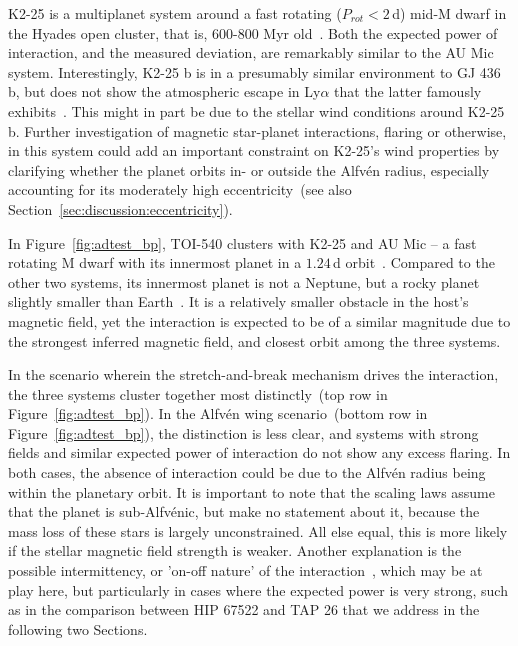 \documentclass[twocolumn]{aastex631}
\begin{document}
K2-25 is a multiplanet system around a fast rotating ($P_{rot}<2\,$d) mid-M dwarf in the Hyades open cluster, that is, 600-800 Myr old~\citep{stefansson2020habitable}. Both the expected power of interaction, and the measured deviation, are remarkably similar to the AU Mic system. Interestingly, K2-25 b is in a presumably similar environment to GJ 436 b, but does not show the atmospheric escape in Ly$\alpha$ that the latter famously exhibits~\citep{rockcliffe2021lya}. This might in part be due to the stellar wind conditions around K2-25 b. Further investigation of magnetic star-planet interactions, flaring or otherwise, in this system could add an important constraint on K2-25's wind properties by clarifying whether the planet orbits in- or outside the Alfv\'en radius, especially accounting for its moderately high eccentricity~(see also Section~\ref{sec:discussion:eccentricity}).

In Figure~\ref{fig:adtest_bp}, TOI-540 clusters with K2-25 and AU Mic -- a fast rotating M dwarf with its innermost planet in a $1.24\,$d orbit~\citep{ment2021toi}. Compared to the other two systems, its innermost planet is not a Neptune, but a rocky planet slightly smaller than Earth~\citep{ment2021toi}. It is a relatively smaller obstacle in the host's magnetic field, yet the interaction is expected to be of a similar magnitude due to the strongest inferred magnetic field, and closest orbit among the three systems. 

In the scenario wherein the stretch-and-break mechanism drives the interaction, the three systems cluster together most distinctly~(top row in Figure~\ref{fig:adtest_bp}). In the Alfv\'en wing scenario~(bottom row in Figure~\ref{fig:adtest_bp}), the distinction is less clear, and systems with strong fields and similar expected power of interaction do not show any excess flaring. In both cases, the absence of interaction could be due to the Alfv\'en radius being within the planetary orbit. It is important to note that the scaling laws assume that the planet is sub-Alfv\'enic, but make no statement about it, because the mass loss of these stars is largely unconstrained. All else equal, this is more likely if the stellar magnetic field strength is weaker. Another explanation is the possible intermittency, or 'on-off nature' of the interaction~\citep{shkolnik2008nature}, which may be at play here, but particularly in cases where the expected power is very strong, such as in the comparison between HIP 67522 and TAP 26 that we address in the following two Sections.
\end{document}
